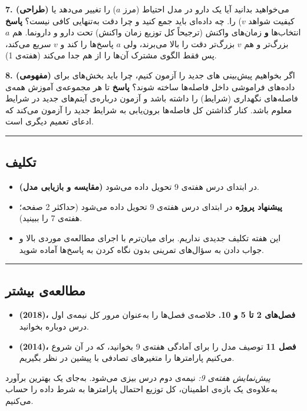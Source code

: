\textbf{7. (طراحی)} می‌خواهید بدانید آیا یک دارو در مدل 
احتیاط (مرز \(a\)) را تغییر می‌دهد یا کیفیت شواهد  \(v\)) را.
چه داده‌ای باید جمع کنید و چرا دقت به‌تنهایی کافی نیست؟ \textbf{پاسخ}
انتخاب‌ها \textbf{و} زمان‌های واکنش (ترجیحاً کل توزیع زمان واکنش) تحت دارو
و دارونما. هم \(a\) بزرگ‌تر و هم \(v\) بزرگ‌تر دقت را بالا می‌برند، ولی
\(a\) پاسخ‌ها را کند و \(v\) سریع می‌کند، پس فقط الگوی مشترک آن‌ها را از هم
جدا می‌کند (هفته‌ی 1).

\textbf{8. (مفهومی)} اگر بخواهیم پیش‌بینی های جدید را آزمون
کنیم، چرا باید بخش‌های  برای داده‌های فراموشی داخل
فاصله‌ها ساخته شوند؟ \textbf{پاسخ} تا هر مجموعه‌ی آموزش همه‌ی فاصله‌های
نگهداری (شرایط) را داشته باشد و آزمون درباره‌ی آیتم‌های جدید در شرایط
معلوم باشد. کنار گذاشتن کل فاصله‌ها برون‌یابی به شرایط جدید را آزمون می‌کند
که ادعای تعمیم دیگری است.

\begin{center}\rule{0.5\linewidth}{0.5pt}\end{center}

\subsection{تکلیف}

\begin{itemize}
\tightlist
\item
  \textbf{ (مقایسه و بازیابی مدل)} در ابتدای درس هفته‌ی 9 تحویل
  داده می‌شود.
\item
  \textbf{پیشنهاد پروژه} در ابتدای درس هفته‌ی 9 تحویل داده می‌شود (حداکثر
  2 صفحه؛ هفته‌ی 7 را ببینید).
\item
  این هفته تکلیف جدیدی نداریم. برای میان‌ترم با اجرای مطالعه‌ی موردی بالا
  و جواب دادن به سؤال‌های تمرینی بدون نگاه کردن به پاسخ‌ها آماده شوید.
\end{itemize}

\begin{center}\rule{0.5\linewidth}{0.5pt}\end{center}

\subsection{مطالعه‌ی بیشتر}

\begin{itemize}
\tightlist
\item
  \textbf{ \lr{\&}  (2018)، فصل‌های 2 تا 5 و 10.}
  خلاصه‌ی فصل‌ها را به‌عنوان مرور کل نیمه‌ی اول درس دوباره بخوانید.
\item
  \textbf{ \lr{\&}  (2014)، فصل 11}  توصیف
  مدل را برای آمادگی هفته‌ی 9 بخوانید، که در آن شروع می‌کنیم پارامترها را
  متغیرهای تصادفی با پیشین در نظر بگیریم.
\end{itemize}

\emph{پیش‌نمایش هفته‌ی 9:} نیمه‌ی دوم درس بیزی می‌شود. به‌جای یک بهترین
برآورد به‌علاوه‌ی یک بازه‌ی اطمینان، کل توزیع احتمال پارامترها به شرط داده
را حساب می‌کنیم.
